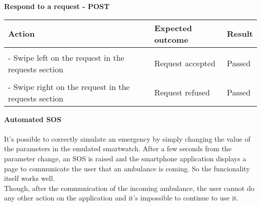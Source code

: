 \newpage

\textbf{Respond to a request - POST}
\begin{center}
	\begin{tabular}{|p{}|p{}|p{}|}
		\hline
		Action & Expected outcome & Result \\
		\hline
		&&\\
		- Swipe left on the request in the requests section & Request accepted & Passed\\
		\hline
		&&\\
		- Swipe right on the request in the requests section & Request refused & Passed\\
	\end{tabular}
\end{center}

\newpage

\textbf{Automated SOS}\\\\
It's possible to correctly simulate an emergency by simply changing the value of the parameters in the emulated smartwatch. After a few seconds from the parameter change, an SOS is raised and the smartphone application displays a page to communicate the user that an ambulance is coming. So the funcionality itself works well.\\
Though, after the communication of the incoming ambulance, the user cannot do any other action on the application and it's impossible to continue to use it. 
